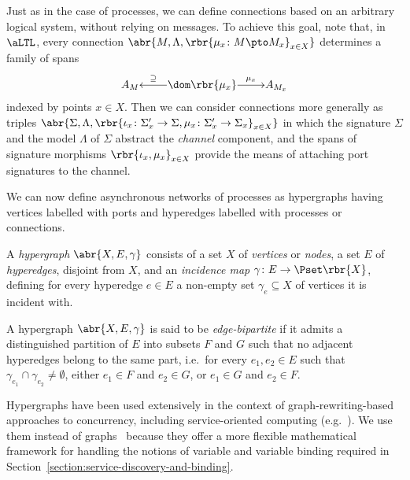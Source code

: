 \documentclass{LMCS}
\begin{document}
  \begin{rem}
    \label{remark:abstract-connection}
    Just as in the case of processes, we can define connections based on an arbitrary logical system, without relying on messages.
    To achieve this goal, note that, in \(\aLTL\), every connection \(\abr{M, \Lambda, \rbr{\mu_{x} \colon M \pto M_{x}}_{x \in X}}\) determines a family of spans 
    \[
    \xymatrix @1 {
      {A_{M}}
      & {\dom\rbr{\mu_{x}}}
      \ar [l] _-{\supseteq}
      \ar [r] ^-{\mu_{x}} 
      & {A_{M_{x}}}
    }
    \]
    indexed by points \(x \in X\).
    Then we can consider connections more generally as triples \(\abr{\Sigma, \Lambda, \rbr{\iota_{x} \colon \Sigma'_{x} \to \Sigma, \mu_{x} \colon \Sigma'_{x} \to \Sigma_{x}}_{x \in X}}\) in which the signature \(\Sigma\) and the model \(\Lambda\) of \(\Sigma\) abstract the \emph{channel} component, and the spans of signature morphisms \(\rbr{\iota_{x}, \mu_{x}}_{x \in X}\) provide the means of attaching port signatures to the channel.
  \end{rem}

  We can now define asynchronous networks of processes as hypergraphs having vertices labelled with ports and hyperedges labelled with processes or connections.

  \begin{defi}[Hypergraph]  
    A \emph{hypergraph} \(\abr{X, E, \gamma}\) consists of a set \(X\) of \emph{vertices} or \emph{nodes}, a set \(E\) of \emph{hyperedges}, disjoint from \(X\), and an \emph{incidence map} \(\gamma \colon E \to \Pset\rbr{X}\), defining for every hyperedge \(e \in E\) a non-empty set \(\gamma_{e} \subseteq X\) of vertices it is incident with.

    A hypergraph \(\abr{X, E, \gamma}\) is said to be \emph{edge-bipartite} if it admits a distinguished partition of \(E\) into subsets \(F\) and \(G\) such that no adjacent hyperedges belong to the same part, i.e.\ for every \(e_{1}, e_{2} \in E\) such that \(\gamma_{e_{1}} \cap \gamma_{e_{2}} \neq \emptyset\), either \(e_{1} \in F\) and \(e_{2} \in G\), or \(e_{1} \in G\) and \(e_{2} \in F\).
  \end{defi}

  Hypergraphs have been used extensively in the context of graph-rewriting-based approaches to concurrency, including service-oriented computing (e.g.~\cite{Bruni-Gadducci-LluchLafuente:A-graph-syntax-for-processes-and-services-2009,Ferrari-Hirsch-Lanese-Montanari-Tuosto:Synchronised-hyperedge-replacement-2005}).  We use them instead of graphs~\cite{Fiadeiro-Lopes:An-interface-theory-for-service-oriented-design-2013} because they offer a more flexible mathematical framework for handling the notions of variable and variable binding required in Section~\ref{section:service-discovery-and-binding}.
\end{document}
